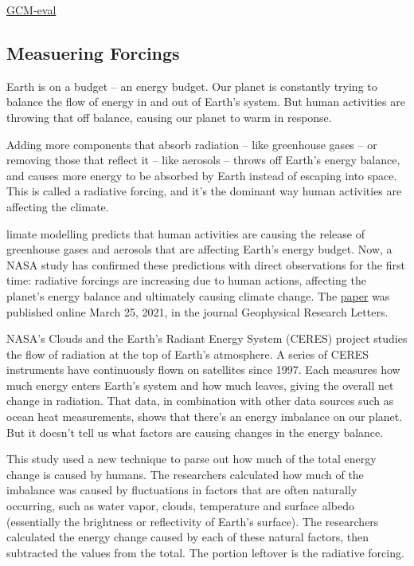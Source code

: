\documentclass[
]{book}
\begin{document}
\href{https://gcmeval.met.no/}{GCM-eval}

\hypertarget{measuering-forcings}{%
\subsection{Measuering Forcings}\label{measuering-forcings}}

Earth is on a budget -- an energy budget. Our planet is constantly trying to balance the flow of energy in and out of Earth's system. But human activities are throwing that off balance, causing our planet to warm in response.

Adding more components that absorb radiation -- like greenhouse gases -- or removing those that reflect it -- like aerosols -- throws off Earth's energy balance, and causes more energy to be absorbed by Earth instead of escaping into space. This is called a radiative forcing, and it's the dominant way human activities are affecting the climate.

limate modelling predicts that human activities are causing the release of greenhouse gases and aerosols that are affecting Earth's energy budget. Now, a NASA study has confirmed these predictions with direct observations for the first time: radiative forcings are increasing due to human actions, affecting the planet's energy balance and ultimately causing climate change.
The \href{https://agupubs.onlinelibrary.wiley.com/doi/10.1029/2020GL091585}{paper} was published online March 25, 2021, in the journal Geophysical Research Letters.

NASA's Clouds and the Earth's Radiant Energy System (CERES) project studies the flow of radiation at the top of Earth's atmosphere. A series of CERES instruments have continuously flown on satellites since 1997. Each measures how much energy enters Earth's system and how much leaves, giving the overall net change in radiation. That data, in combination with other data sources such as ocean heat measurements, shows that there's an energy imbalance on our planet.
But it doesn't tell us what factors are causing changes in the energy balance.

This study used a new technique to parse out how much of the total energy change is caused by humans. The researchers calculated how much of the imbalance was caused by fluctuations in factors that are often naturally occurring, such as water vapor, clouds, temperature and surface albedo (essentially the brightness or reflectivity of Earth's surface).
The researchers calculated the energy change caused by each of these natural factors, then subtracted the values from the total. The portion leftover is the radiative forcing.
\end{document}
